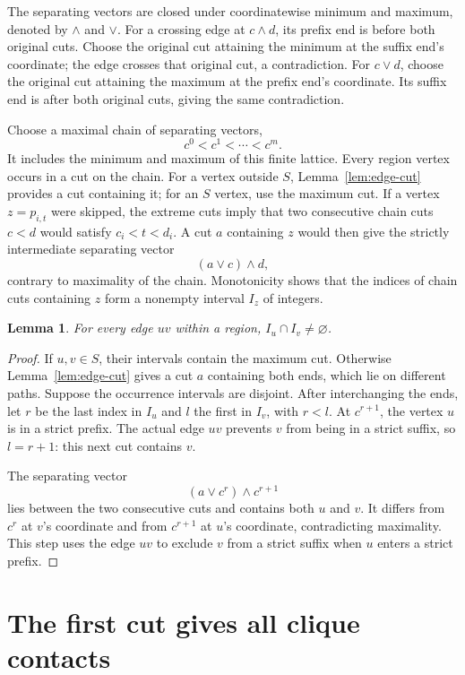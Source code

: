 \documentclass[11pt]{amsart}
\newtheorem{lemma}[theorem]{Lemma}
\begin{document}
The separating vectors are closed under coordinatewise minimum and
maximum, denoted by $\wedge$ and $\vee$. For a crossing edge at
$c\wedge d$, its prefix end is before both original cuts. Choose the
original cut attaining the minimum at the suffix end's coordinate;
the edge crosses that original cut, a contradiction. For $c\vee d$,
choose the original cut attaining the maximum at the prefix end's
coordinate. Its suffix end is after both original cuts, giving the
same contradiction.

Choose a maximal chain of separating vectors,
\[
 c^0<c^1<\cdots<c^m.
\]
It includes the minimum and maximum of this finite lattice. Every
region vertex occurs in a cut on the chain. For a vertex outside $S$,
Lemma~\ref{lem:edge-cut} provides a cut containing it; for an $S$
vertex, use the maximum cut. If a vertex $z=p_{i,t}$ were skipped,
the extreme cuts imply that two consecutive chain cuts $c<d$ would
satisfy $c_i<t<d_i$. A cut $a$ containing $z$ would then give the
strictly intermediate separating vector
\[
 (a\vee c)\wedge d,
\]
contrary to maximality of the chain. Monotonicity shows that the
indices of chain cuts containing $z$ form a nonempty interval $I_z$
of integers.

\begin{lemma}\label{lem:edge-overlap}
For every edge $uv$ within a region, $I_u\cap I_v\ne\varnothing$.
\end{lemma}

\begin{proof}
If $u,v\in S$, their intervals contain the maximum cut. Otherwise
Lemma~\ref{lem:edge-cut} gives a cut $a$ containing both ends, which
lie on different paths. Suppose the occurrence intervals are disjoint.
After interchanging the ends, let $r$ be the last index in $I_u$ and
$l$ the first in $I_v$, with $r<l$. At $c^{r+1}$, the vertex $u$ is
in a strict prefix. The actual edge $uv$ prevents $v$ from being in
a strict suffix, so $l=r+1$: this next cut contains $v$.

The separating vector
\[
 (a\vee c^r)\wedge c^{r+1}
\]
lies between the two consecutive cuts and contains both $u$ and $v$.
It differs from $c^r$ at $v$'s coordinate and from $c^{r+1}$ at
$u$'s coordinate, contradicting maximality. This step uses the edge
$uv$ to exclude $v$ from a strict suffix when $u$ enters a strict prefix.
\end{proof}

\section{The first cut gives all clique contacts}\label{sec:contacts}
\end{document}
